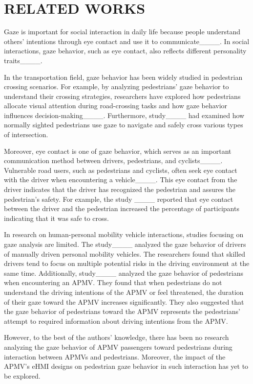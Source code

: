 \section{RELATED WORKS}
Gaze is important for social interaction in daily life because people understand others' intentions through eye contact and use it to communicate____.
In social interactions, gaze behavior, such as eye contact, also reflects different personality traits____.

In the transportation field, gaze behavior has been widely studied in pedestrian crossing scenarios. 
For example, by analyzing pedestrians' gaze behavior to understand their crossing strategies, researchers have explored how pedestrians allocate visual attention during road-crossing tasks and how gaze behavior influences decision-making____.
Furthermore, study____ had examined how normally sighted pedestrians use gaze to navigate and safely cross various types of intersection.


Moreover, eye contact is one of gaze behavior, which serves as an important communication method between drivers, pedestrians, and cyclists____.
Vulnerable road users, such as pedestrians and cyclists, often seek eye contact with the driver when encountering a vehicle____.
This eye contact from the driver indicates that the driver has recognized the pedestrian and assures the pedestrian's safety.
For example, the study ____ reported that eye contact between the driver and the pedestrian increased the percentage of participants indicating that it was safe to cross.



In research on human-personal mobility vehicle interactions, studies focusing on gaze analysis are limited.
The study____ analyzed the gaze behavior of drivers of manually driven personal mobility vehicles. 
The researchers found that skilled drivers tend to focus on multiple potential risks in the driving environment at the same time.
Additionally, study____ analyzed the gaze behavior of pedestrians when encountering an APMV. 
They found that when pedestrians do not understand the driving intentions of the APMV or feel threatened, the duration of their gaze toward the APMV increases significantly. 
They also suggested that the gaze behavior of pedestrians toward the APMV represents the pedestrians' attempt to required information about driving intentions from the APMV.

However, to the best of the authors' knowledge, there has been no research analyzing the gaze behavior of APMV passengers toward pedestrians during interaction between APMVs and pedestrians. Moreover, the impact of the APMV's eHMI designs on pedestrian gaze behavior in such interaction has yet to be explored.




